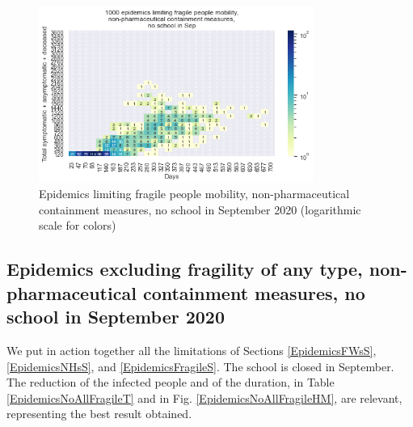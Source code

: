 \documentclass[graybox]{svmult}
\begin{document}
\begin{figure}[t]
\begin{center}
\includegraphics[width=0.8\textwidth]{HM30_readRunResults1k_with_Frag_at20_plusHMlog.png}
\caption{Epidemics limiting fragile people mobility, non-pharmaceutical containment measures, no school in September 2020 (logarithmic scale for colors)}
\label{EpidemicsFragileHM}
\end{center}
\end{figure}



\subsection{Epidemics excluding fragility of any type, non-pharmaceutical containment measures, no school in September 2020}
\label{EpidemicsNoAllFragileS}

We put in action together all the limitations of Sections \ref{EpidemicsFWsS}, \ref{EpidemicsNHsS}, and \ref{EpidemicsFragileS}. The school is closed in September. The reduction of the infected people and of the duration, in Table \ref{EpidemicsNoAllFragileT} and in Fig. \ref{EpidemicsNoAllFragileHM}, are relevant, representing the best result obtained.
\end{document}
